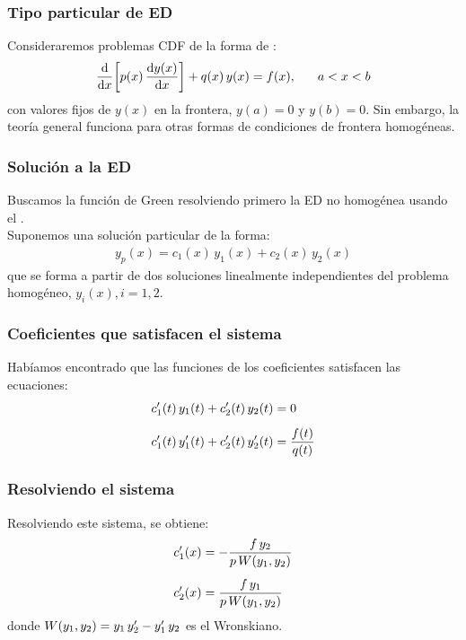 \documentclass[12pt]{beamer}
\begin{document}
\begin{frame}
\frametitle{Tipo particular de ED}
Consideraremos problemas CDF de la forma de :
\pause
\begin{align}
\dv{x} \bigg[ p (x) \, \dv{y (x)}{x} \bigg] + q (x) \, y (x) = f (x), \hspace{0.6cm} a < x < b
\label{eq:ecuacion_07_25}
\end{align}
con valores fijos de $y (x)$ en la frontera, $y (a) = 0$ y $y (b) = 0$. \pause Sin embargo, la teoría general funciona para otras formas de condiciones de frontera homogéneas.
\end{frame}

\begin{frame}
\frametitle{Solución a la ED}
Buscamos la función de Green resolviendo primero la ED no homogénea usando el .
\\
\bigskip
\pause
Suponemos una solución particular de la forma:
\pause
\begin{align*}
y_{p} (x) = c_{1} (x) \, y_{1} (x) + c_{2} (x) \, y_{2} (x)
\end{align*}
que se forma a partir de dos soluciones linealmente independientes del problema homogéneo, $y_{i} (x), i = 1, 2$.
\end{frame}

\begin{frame}
\frametitle{Coeficientes que satisfacen el sistema}
Habíamos encontrado que las funciones de los coeficientes satisfacen las ecuaciones:
\pause
\begin{align}
\begin{aligned}[b]
{c}^{\prime}_{1} (t) \, y_{1} (t) + {c}^{\prime}_{2} (t) \, y_{2} (t) &= 0 \\[0.5em]
{c}^{\prime}_{1} (t) \, {y}^{\prime}_{1} (t) + {c}^{\prime}_{2} (t) \, {y}^{\prime}_{2} (t) &= \dfrac{f (t)}{q (t)}
\end{aligned}
\label{eq:ecuacion_07_26}
\end{align}
\end{frame}

\begin{frame}
\frametitle{Resolviendo el sistema}
Resolviendo este sistema, se obtiene:
\pause
\begin{align*}
{c}^{\prime}_{1} (x) &= - \dfrac{f \, y_{2}}{p \, W (y_{1}, y_{2})} \\[0.5em]
{c}^{\prime}_{2} (x) &= \dfrac{f \, y_{1}}{p \, W (y_{1}, y_{2})}
\end{align*}
donde $W (y_{1}, y_{2}) = y_{1} \, {y}^{\prime}_{2} - {y}^{\prime}_{1} \, y_{2}$ es el Wronskiano.
\end{frame}
\end{document}
